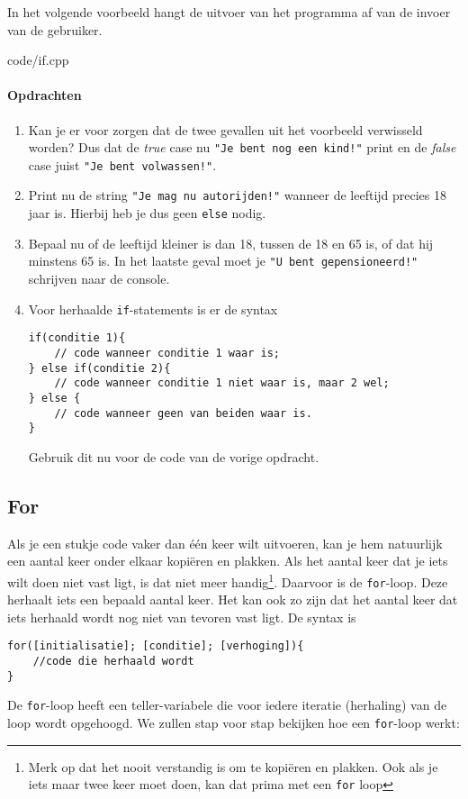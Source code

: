 \documentclass[12pt,a4paper]{article}
\newcommand{\code}{}
\newcommand{\icode}{\lstinline}
\begin{document}
In het volgende voorbeeld hangt de uitvoer van het programma af van de invoer van de gebruiker.

\code{code/if.cpp}

\paragraph{Opdrachten}
\begin{enumerate}
		\item
		Kan je er voor zorgen dat de twee gevallen uit het voorbeeld verwisseld worden? Dus dat de \emph{true} case nu \icode{"Je bent nog een kind!"} print en de \emph{false} case juist \icode{"Je bent volwassen!"}.
		\item
			Print nu de string \icode{"Je mag nu autorijden!"} wanneer de leeftijd precies 18 jaar is. Hierbij heb je dus geen \icode{else} nodig.
		\item
			Bepaal nu of de leeftijd kleiner is dan 18, tussen de 18 en 65 is, of dat hij minstens 65 is. In het laatste geval moet je \icode{"U bent gepensioneerd!"} schrijven naar de console.
		\item
			Voor herhaalde \icode{if}-statements is er de syntax
\begin{lstlisting}
if(conditie 1){
	// code wanneer conditie 1 waar is;
} else if(conditie 2){
	// code wanneer conditie 1 niet waar is, maar 2 wel;
} else {
	// code wanneer geen van beiden waar is.
}
\end{lstlisting}
Gebruik dit nu voor de code van de vorige opdracht.
\end{enumerate}


\subsection{For}
Als je een stukje code vaker dan \'e\'en keer wilt uitvoeren, kan je hem natuurlijk een aantal keer onder elkaar kopi\"eren en plakken. Als het aantal keer dat je iets wilt doen niet vast ligt, is dat niet meer handig\footnote{Merk op dat het nooit verstandig is om te kopi\"eren en plakken. Ook als je iets maar twee keer moet doen, kan dat prima met een \icode{for} loop}. Daarvoor is de \icode{for}-loop.
Deze herhaalt iets een bepaald aantal keer. Het kan ook zo zijn dat het aantal keer dat iets herhaald wordt nog niet van tevoren vast ligt. De syntax is 
\begin{lstlisting}
for([initialisatie]; [conditie]; [verhoging]){
	//code die herhaald wordt
}
\end{lstlisting}
De \icode{for}-loop heeft een teller-variabele die voor iedere iteratie (herhaling) van de loop wordt opgehoogd. We zullen stap voor stap bekijken hoe een \icode{for}-loop werkt:
\end{document}
